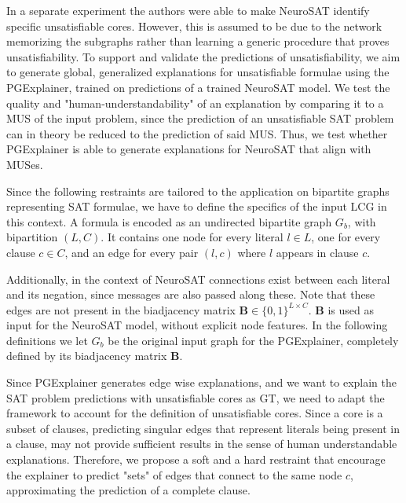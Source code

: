 In a separate experiment the authors were able to make NeuroSAT identify specific unsatisfiable cores. However, this is assumed to be due to the network memorizing the subgraphs rather than learning a generic procedure that proves unsatisfiability. To support and validate the predictions of unsatisfiability, we aim to generate global, generalized explanations for unsatisfiable formulae using the PGExplainer, trained on predictions of a trained NeuroSAT model. We test the quality and "human-understandability" of an explanation by comparing it to a MUS of the input problem, since the prediction of an unsatisfiable SAT problem can in theory be reduced to the prediction of said MUS. Thus, we test whether PGExplainer is able to generate explanations for NeuroSAT that align with MUSes.

Since the following restraints are tailored to the application on bipartite graphs representing SAT formulae, we have to define the specifics of the input LCG in this context. A formula is encoded as an undirected bipartite graph $G_b$, with bipartition $(L,C)$. It contains one node for every literal $l \in L$, one for every clause $c \in C$, and an edge for every pair $(l,c)$ where $l$ appears in clause $c$. 

Additionally, in the context of NeuroSAT connections exist between each literal and its negation, since messages are also passed along these. Note that these edges are not present in the biadjacency matrix $\mathbf{B}\in \{0,1\}^{L\times C}$. $\mathbf{B}$ is used as input for the NeuroSAT model, without explicit node features. In the following definitions we let $G_b$ be the original input graph for the PGExplainer, completely defined by its biadjacency matrix $\mathbf{B}$. \bigskip


Since PGExplainer generates edge wise explanations, and we want to explain the SAT problem predictions with unsatisfiable cores as \ac{GT}, we need to adapt the framework to account for the definition of unsatisfiable cores. Since a core is a subset of clauses, predicting singular edges that represent literals being present in a clause, may not provide sufficient results in the sense of human understandable explanations. Therefore, we propose a soft and a hard restraint that encourage the explainer to predict "sets" of edges that connect to the same node $c$, approximating the prediction of a complete clause.

